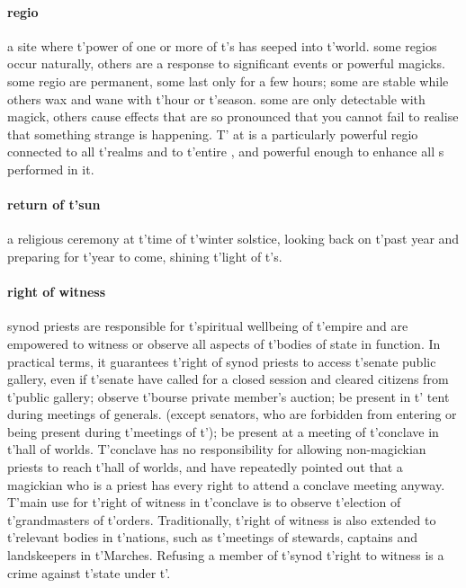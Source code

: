 \paragraph{regio} a site where t'\allowbreak power of one or more of t'\allowbreak {}s has seeped into t'\allowbreak world. some regios occur naturally, others are a response to significant events or powerful magicks. some regio are permanent, some last only for a few hours; some are stable while others wax and wane with t'\allowbreak hour or t'\allowbreak season. some are only detectable with magick, others cause effects that are so pronounced that you cannot fail to realise that something strange is happening. T' at  is a particularly powerful regio connected to all t'\allowbreak realms and to t'\allowbreak entire , and powerful enough to enhance all s performed in it.
\paragraph{return of t'sun} a religious ceremony at t'\allowbreak time of t'\allowbreak winter solstice, looking back on t'\allowbreak past year and preparing for t'\allowbreak year to come, shining t'\allowbreak light of t'\allowbreak {}s.
\paragraph{right of witness} synod priests are responsible for t'\allowbreak spiritual wellbeing of t'\allowbreak empire and are empowered to witness or observe all aspects of t'\allowbreak bodies of state in function. In practical terms, it guarantees t'\allowbreak right of synod priests to access t'\allowbreak senate public gallery, even if t'\allowbreak senate have called for a closed session and cleared citizens from t'\allowbreak public gallery; observe t'\allowbreak bourse private member's auction; be present in t'\allowbreak {} tent during meetings of generals. (except senators, who are forbidden from entering or being present during t'\allowbreak meetings of t'\allowbreak {}); be present at a meeting of t'\allowbreak conclave in t'\allowbreak hall of worlds. T'conclave has no responsibility for allowing non-magickian priests to reach t'\allowbreak hall of worlds, and have repeatedly pointed out that a magickian who is a priest has every right to attend a conclave meeting anyway. T'main use for t'\allowbreak right of witness in t'\allowbreak conclave is to observe t'\allowbreak election of t'\allowbreak grandmasters of t'\allowbreak orders. Traditionally, t'\allowbreak right of witness is also extended to t'\allowbreak relevant bodies in t'\allowbreak nations, such as t'\allowbreak meetings of stewards, captains and landskeepers in t'\allowbreak Marches. Refusing a member of t'\allowbreak synod t'\allowbreak right to witness is a crime against t'\allowbreak state under t'\allowbreak {}. 
